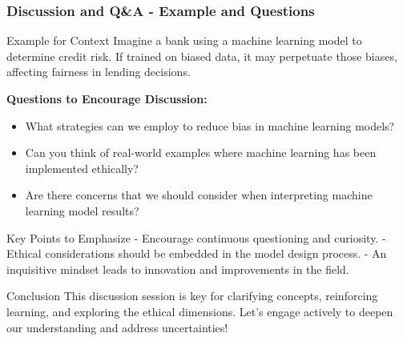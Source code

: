 \documentclass[aspectratio=169]{beamer}
\begin{document}
\begin{frame}[fragile]
    \frametitle{Discussion and Q\&A - Example and Questions}
    \begin{block}{Example for Context}
        Imagine a bank using a machine learning model to determine credit risk. If trained on biased data, it may perpetuate those biases, affecting fairness in lending decisions.
    \end{block}

    \textbf{Questions to Encourage Discussion:}
    \begin{itemize}
        \item What strategies can we employ to reduce bias in machine learning models?
        \item Can you think of real-world examples where machine learning has been implemented ethically?
        \item Are there concerns that we should consider when interpreting machine learning model results?
    \end{itemize}
    
    \begin{block}{Key Points to Emphasize}
        - Encourage continuous questioning and curiosity.
        - Ethical considerations should be embedded in the model design process.
        - An inquisitive mindset leads to innovation and improvements in the field.
    \end{block}
    
    \begin{block}{Conclusion}
        This discussion session is key for clarifying concepts, reinforcing learning, and exploring the ethical dimensions. Let's engage actively to deepen our understanding and address uncertainties!
    \end{block}
\end{frame}
\end{document}
